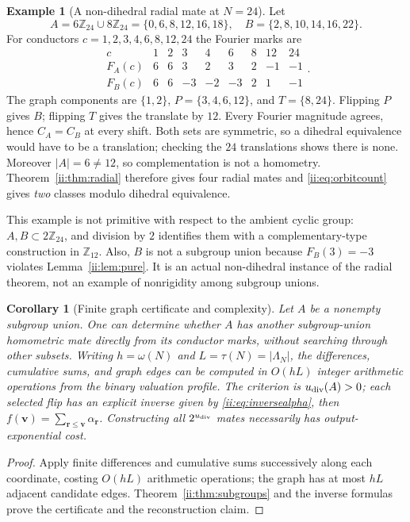 \documentclass[11pt]{article}
\numberwithin{equation}{section}
\newtheorem{corollary}[theorem]{Corollary}
\theoremstyle{definition}
\newtheorem{example}[theorem]{Example}
\theoremstyle{remark}
\newcommand{\rvec}{\boldsymbol{r}}
\newcommand{\vv}{\boldsymbol{v}}
\begin{document}
\begin{example}[A non-dihedral radial mate at $N=24$]\label{ii:ex:24}
Let
\[
 A=6\mathbb Z_{24}\cup8\mathbb Z_{24}=\{0,6,8,12,16,18\},
 \quad B=\{2,8,10,14,16,22\}.
\]
For conductors $c=1,2,3,4,6,8,12,24$ the Fourier marks are
\[
\begin{array}{c|rrrrrrrr}
 c&1&2&3&4&6&8&12&24\\\hline
 F_A(c)&6&6&3&2&3&2&-1&-1\\
 F_B(c)&6&6&-3&-2&-3&2&1&-1
\end{array}.
\]
The graph components are $\{1,2\}$, $P=\{3,4,6,12\}$, and $T=\{8,24\}$.  Flipping $P$ gives $B$; flipping $T$ gives the translate by $12$.  Every Fourier magnitude agrees, hence $C_A=C_B$ at every shift.  Both sets are symmetric, so a dihedral equivalence would have to be a translation; checking the $24$ translations shows there is none.  Moreover $|A|=6\ne12$, so complementation is not a homometry.  Theorem~\ref{ii:thm:radial} therefore gives four radial mates and \eqref{ii:eq:orbitcount} gives \emph{two} classes modulo dihedral equivalence.

This example is not primitive with respect to the ambient cyclic group: $A,B\subset2\mathbb Z_{24}$, and division by $2$ identifies them with a complementary-type construction in $\mathbb Z_{12}$.  Also, $B$ is not a subgroup union because $F_B(3)=-3$ violates Lemma~\ref{ii:lem:pure}.  It is an actual non-dihedral instance of the radial theorem, not an example of nonrigidity among subgroup unions.
\end{example}

\begin{corollary}[Finite graph certificate and complexity]\label{ii:cor:certificate}
Let $A$ be a nonempty subgroup union.  One can determine whether $A$ has another subgroup-union homometric mate directly from its conductor marks, without searching through other subsets.  Writing $h=\omega(N)$ and $L=\tau(N)=|\Lambda_N|$, the differences, cumulative sums, and graph edges can be computed in $O(hL)$ integer arithmetic operations from the binary valuation profile.  The criterion is $u_{\rm div}(A)>0$; each selected flip has an explicit inverse given by \eqref{ii:eq:inversealpha}, then $f(\vv)=\sum_{\rvec\le\vv}\alpha_{\rvec}$.  Constructing all $2^{u_{\rm div}}$ mates necessarily has output-exponential cost.
\end{corollary}
\begin{proof}
Apply finite differences and cumulative sums successively along each coordinate, costing $O(hL)$ arithmetic operations; the graph has at most $hL$ adjacent candidate edges.  Theorem~\ref{ii:thm:subgroups} and the inverse formulas prove the certificate and the reconstruction claim.
\end{proof}
\end{document}
